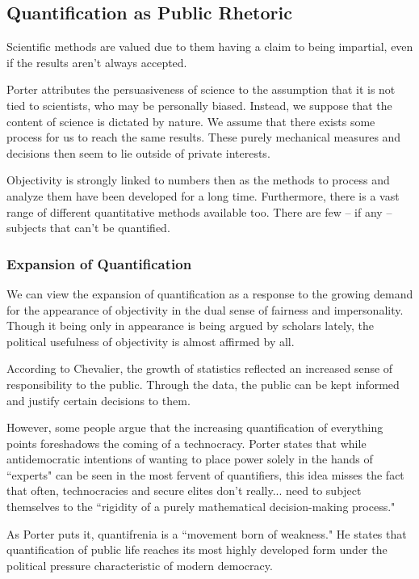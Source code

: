 \documentclass[openany]{book}
\begin{document}
\subsection{Quantification as Public Rhetoric}
Scientific methods are valued due to them having a claim to being impartial, even if the results aren't always accepted.

Porter attributes the persuasiveness of science to the assumption that it is not tied to scientists, who may be personally biased. Instead, we suppose that the content of science is dictated by nature. We assume that there exists some process for us to reach the same results. These purely mechanical measures and decisions then seem to lie outside of private interests.

Objectivity is strongly linked to numbers then as the methods to process and analyze them have been developed for a long time. Furthermore, there is a vast range of different quantitative methods available too. There are few -- if any -- subjects that can't be quantified.

\subsubsection{Expansion of Quantification}
We can view the expansion of quantification as a response to the growing demand for the appearance of objectivity in the dual sense of fairness and impersonality. Though it being only in appearance is being argued by scholars lately, the political usefulness of objectivity is almost affirmed by all.

According to Chevalier, the growth of statistics reflected an increased sense of responsibility to the public. Through the data, the public can be kept informed and justify certain decisions to them.

However, some people argue that the increasing quantification of everything points foreshadows the coming of a technocracy. Porter states that while antidemocratic intentions of wanting to place power solely in the hands of ``experts" can be seen in the most fervent of quantifiers, this idea misses the fact that often, technocracies and secure elites don't really... need to subject themselves to the ``rigidity of a purely mathematical decision-making process."

As Porter puts it, quantifrenia is a ``movement born of weakness." He states that quantification of public life reaches its most highly developed form under the political pressure characteristic of modern democracy.
\end{document}
